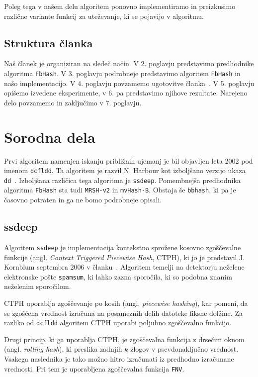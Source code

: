 \documentclass{acm_proc_article-sp}
\begin{document}
Poleg tega v našem delu algoritem ponovno implementiramo in preizkusimo različne variante funkcij za uteževanje, ki se pojavijo v algoritmu.

\subsection{Struktura članka}

Naš članek je organiziran na sledeč način. V 2. poglavju predstavimo predhodnike algoritma \texttt{FbHash}. V 3. poglavju podrobneje predstavimo algoritem \texttt{FbHash} in našo implementacijo. V 4. poglavju povzamemo ugotovitve članka~\cite{fbhash}. V 5. poglavju opišemo izvedene eksperimente, v 6. pa predstavimo njihove rezultate. Narejeno delo povzamemo in zaključimo v 7. poglavju.

\section{Sorodna dela}
Prvi algoritem namenjen iskanju približnih ujemanj je bil objavljen leta 2002 pod imenom \texttt{dcfldd}. Ta algoritem je razvil N. Harbour kot izboljšano verzijo ukaza \texttt{dd}~\cite{dcfldd}. Izboljšana različica tega algoritma je \texttt{ssdeep}. Pomembnejša predhodnika algoritma \texttt{FbHash} sta tudi \texttt{MRSH-v2} in \texttt{mvHash-B}. Obstaja še \texttt{bbhash}, ki pa je časovno potraten in ga ne bomo podrobneje opisali.

\subsection{ssdeep}
Algoritem \texttt{ssdeep} je implementacija kontekstno sprožene kosovno zgoščevalne funkcije (angl. \emph{Context Triggered Piecewise Hash}, CTPH), ki jo je predstavil J. Kornblum septembra 2006 v članku~\cite{kornblum:ctph}. Algoritem temelji na detektorju neželene elektronske pošte \texttt{spamsum}, ki lahko zazna sporočila, ki so podobna znanim neželenim sporočilom.

CTPH uporablja zgoščevanje po kosih (angl. \emph{piecewise hashing}), kar pomeni, da se zgoščena vrednost izračuna na posameznih delih datoteke fiksne dolžine. Za razliko od \texttt{dcfldd} algoritem CTPH uporabi poljubno zgoščevalno funkcijo.

Drugi princip, ki ga uporablja CTPH, je zgoščevalna funkcija z drsečim oknom (angl. \emph{rolling hash}), ki preslika zadnjih $k$ zlogov v psevdonaključno vrednost. Vsakega naslednika je tako možno hitro izračunati iz predhodno izračunane vrednosti. Pri tem je uporabljena zgoščevalna funkcija \texttt{FNV}.
\end{document}
